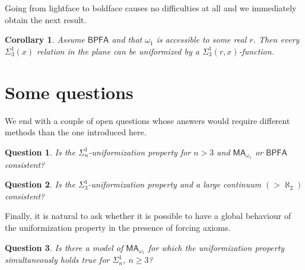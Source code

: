 \documentclass[a4paper,12pt]{article}
\newtheorem{corollary}[theorem]{Corollary}
\newtheorem{question}{Question}
\newcommand{\BPFA}{\mathsf{BPFA}}
\newcommand{\MA}{\mathsf{MA}_{\omega_1}}
\begin{document}
Going from lightface to boldface causes no difficulties at all and we immediately obtain the next result.

\begin{corollary}
Assume $\BPFA$ and that $\omega_1$ is accessible to some real $r$. Then every $\Sigma^1_3(x)$ relation in the plane can be uniformized by a $\Sigma^1_3(r,x)$-function.

\end{corollary}




\section{Some questions}
We end with a couple of open questions whose answers would require different methods than the one introduced here. 
\begin{question}
Is the $\Sigma^1_n$-uniformization property for $n > 3$ and $\MA$ or $\BPFA$ consistent?
\end{question}

\begin{question}
Is the $\Sigma^1_3$-uniformization property and a large continuum $(> \aleph_2)$  consistent?
\end{question}
Finally, it is natural to ask whether it is possible to have  a  global behaviour of the uniformization property in the presence of forcing axioms.
\begin{question}
Is there a model of $\MA$ for which the uniformization property simultaneously holds true for $\Sigma^1_n$, $n \ge 3$?
\end{question}
\end{document}
